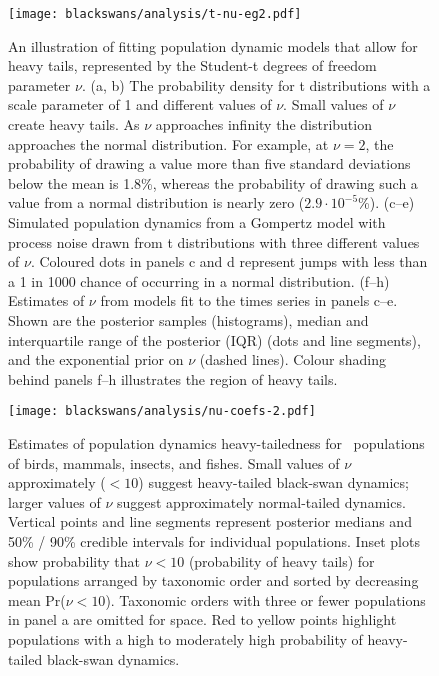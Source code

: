 \begin{figure}[htbp]
\begin{center}
\texttt{[image: blackswans/analysis/t-nu-eg2.pdf]}
\caption[An illustration of fitting population dynamic models that allow for heavy
tails, represented by the Student-t degrees of freedom parameter $\nu$.]{
An illustration of fitting population dynamic models that allow for heavy
tails, represented by the Student-t degrees of freedom parameter $\nu$. (a, b)
The probability density for t distributions with a scale parameter of 1 and
different values of $\nu$. Small values of $\nu$ create heavy tails. As $\nu$
approaches infinity the distribution approaches the normal distribution. For
example, at $\nu = 2$, the probability of drawing a value more than five
standard deviations below the mean is 1.8\%, whereas the probability of drawing
such a value from a normal distribution is nearly zero ($2.9\cdot10^{-5}$\%).
(c--e) Simulated population dynamics from a Gompertz model with process noise
drawn from t distributions with three different values of $\nu$. Coloured dots
in panels c and d represent jumps with less than a 1 in 1000 chance of
occurring in a normal distribution. (f--h) Estimates of $\nu$ from models fit
to the times series in panels c--e. Shown are the posterior samples
(histograms), median and interquartile range of the posterior (IQR) (dots and
line segments), and the exponential prior on $\nu$ (dashed lines). Colour
shading behind panels f--h illustrates the region of heavy tails.
}
\label{fig:didactic}
\end{center}
\end{figure}

\clearpage

\begin{figure}[htbp]
\begin{center}
\texttt{[image: blackswans/analysis/nu-coefs-2.pdf]}

\caption[Estimates of population dynamics heavy-tailedness for \nuCoefPopN\
  populations of birds, mammals, insects, and fishes.]{Estimates of population dynamics heavy-tailedness for \nuCoefPopN\
  populations of birds, mammals, insects, and fishes. Small values of $\nu$
  approximately ($< 10$) suggest heavy-tailed black-swan dynamics; larger values of
  $\nu$ suggest approximately normal-tailed dynamics. Vertical points and line
  segments represent posterior medians and 50\% / 90\% credible intervals for
  individual populations. Inset plots show probability that $\nu < 10$
  (probability of heavy tails) for populations arranged by taxonomic order and
  sorted by decreasing mean Pr($\nu < 10$). Taxonomic orders with three or
  fewer populations in panel a are omitted for space. Red to yellow points
  highlight populations with a high to moderately high probability of
  heavy-tailed black-swan dynamics.}

\label{fig:nu-coefs}
\end{center}
\end{figure}
\clearpage

